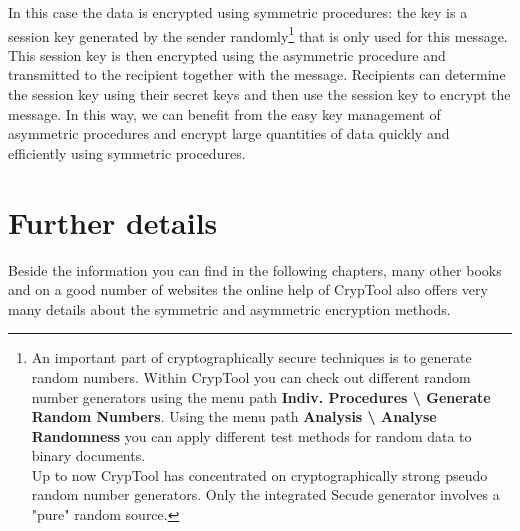 In this case the data is encrypted using symmetric procedures: the key is a
session key generated by the sender
randomly\footnote{%
An important part of cryptographically secure techniques is to generate 
random numbers. Within CrypTool you can check out
different random number generators using the menu path
{\bf Indiv. Procedures \textbackslash{} Generate Random Numbers}. 
Using the menu path {\bf Analysis \textbackslash{} Analyse Randomness}
you can apply different test methods for random data to binary documents. \\
Up to now CrypTool has concentrated on cryptographically strong 
pseudo random number generators. Only the integrated Secude
generator involves a "pure" random source. 
}
that is only used for this message.
This session key is then encrypted using the asymmetric procedure and
transmitted to the recipient together with the message. Recipients can determine
the session key using their secret keys and then use the session key to encrypt
the message. In this way, we can benefit from the easy key management
 of asymmetric procedures and encrypt large quantities of data
quickly and efficiently using symmetric procedures.


\section{Further details}

Beside the information you can find in the following chapters, many other
books and on a good number of websites the online help of 
CrypTool also offers very many details about the 
symmetric and asymmetric encryption methods.


